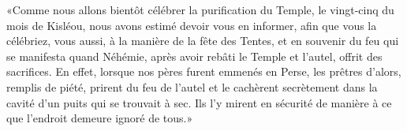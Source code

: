 «Comme nous allons bientôt célébrer la purification du Temple,
		le vingt-cinq du mois de Kisléou,
	nous avons estimé devoir vous en informer, afin que vous la célébriez, vous aussi,
	à la manière de la fête des Tentes,
	et en souvenir du feu qui se manifesta
	quand Néhémie, après avoir rebâti le Temple et l’autel, offrit des sacrifices.
En effet, lorsque nos pères furent emmenés en Perse,
	les prêtres d’alors, remplis de piété, prirent du feu de l’autel
	et le cachèrent secrètement dans la cavité d’un puits qui se trouvait à sec.
Ils l’y mirent en sécurité de manière à ce que l’endroit demeure ignoré de tous.»
